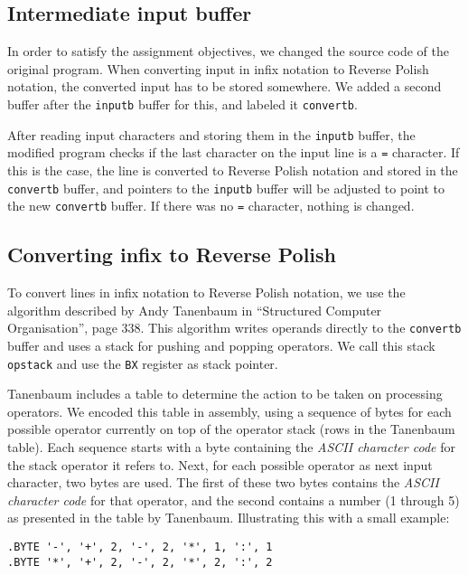 \documentclass[11pt]{article}
\begin{document}
\subsection{Intermediate input buffer}

In order to satisfy the assignment objectives, we changed the source code of the original program. When converting input in infix notation to Reverse Polish notation, the converted input has to be stored somewhere. We added a second buffer after the \verb|inputb| buffer for this, and labeled it \verb|convertb|.

After reading input characters and storing them in the \verb|inputb| buffer, the modified program checks if the last character on the input line is a \verb|=| character. If this is the case, the line is converted to Reverse Polish notation and stored in the \verb|convertb| buffer, and pointers to the \verb|inputb| buffer will be adjusted to point to the new \verb|convertb| buffer. If there was no \verb|=| character, nothing is changed.

\subsection{Converting infix to Reverse Polish}

To convert lines in infix notation to Reverse Polish notation, we use the algorithm described by Andy Tanenbaum in ``Structured Computer Organisation'', page 338. This algorithm writes operands directly to the \verb|convertb| buffer and uses a stack for pushing and popping operators. We call this stack \verb|opstack| and use the \verb|BX| register as stack pointer.

Tanenbaum includes a table to determine the action to be taken on processing operators. We encoded this table in assembly, using a sequence of bytes for each possible operator currently on top of the operator stack (rows in the Tanenbaum table). Each sequence starts with a byte containing the \emph{ASCII character code} for the stack operator it refers to. Next, for each possible operator as next input character, two bytes are used. The first of these two bytes contains the \emph{ASCII character code} for that operator, and the second contains a number (1 through 5) as presented in the table by Tanenbaum. Illustrating this with a small example:

\begin{verbatim}
.BYTE '-', '+', 2, '-', 2, '*', 1, ':', 1
.BYTE '*', '+', 2, '-', 2, '*', 2, ':', 2
\end{verbatim}
\end{document}
